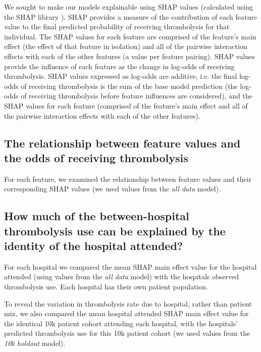 We sought to make our models explainable using SHAP values (calculated using the SHAP library \cite{lundberg_unified_2017}). SHAP provides a measure of the contribution of each feature value to the final predicted probability of receiving thrombolysis for that individual. The SHAP values for each feature are comprised of the feature’s main effect (the effect of that feature in isolation) and all of the pairwise interaction effects with each of the other features (a value per feature pairing). SHAP values provide the influence of each feature as the change in log-odds of receiving thrombolysis. SHAP values expressed as log-odds are additive, i.e. the final log-odds of receiving thrombolysis is the sum of the base model prediction (the log-odds of receiving thrombolysis before feature influences are considered), and the SHAP values for each feature (comprised of the feature's main effect and all of the pairwise interaction effects with each of the other features). 

\subsection{The relationship between feature values and the odds of receiving thrombolysis}

For each feature, we examined the relationship between feature values and their corresponding SHAP values (we used values from the \emph{all data} model).

\subsection{How much of the between-hospital thrombolysis use can be explained by the identity of the hospital attended?}

For each hospital we compared the mean SHAP main effect value for the hospital attended (using values from the \emph{all data} model) with the hospitals observed thrombolysis use. Each hospital has their own patient population.

To reveal the variation in thrombolysis rate due to hospital, rather than patient mix, we also compared the mean hospital attended SHAP main effect value for the identical 10k patient cohort attending each hospital, with the hospitals' predicted thrombolysis use for this 10k patient cohort (we used values from the \emph{10k holdout} model).

